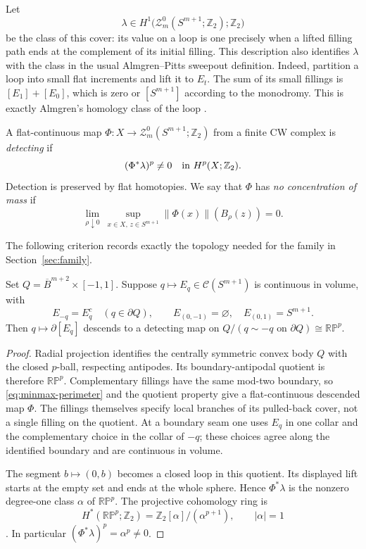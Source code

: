 Let
\[
 \lambda\in H^1\bigl(\mathcal Z_m^0(S^{m+1};\mathbb Z_2);
                     \mathbb Z_2\bigr)
\]
be the class of this cover: its value on a loop is one precisely when
a lifted filling path ends at the complement of its initial filling.
This description also identifies $\lambda$ with the class in the usual
Almgren--Pitts sweepout definition. Indeed, partition a loop into small
flat increments and lift it to $E_t$. The sum of its small fillings is
$[E_1]+[E_0]$, which is zero or $[S^{m+1}]$ according to the
monodromy. This is exactly Almgren's homology class of the loop
\cite[\S\S3.1--3.3 and the beginning of \S4]{MarquesNeves2017}.

\begin{definition}[Detection]\label{def:detecting}
A flat-continuous map
$\Phi:X\to\mathcal Z_m^0(S^{m+1};\mathbb Z_2)$ from a finite CW
complex is \emph{detecting} if
\[
 (\Phi^*\lambda)^p\ne0\quad\hbox{in }H^p(X;\mathbb Z_2).
\]
Detection is preserved by flat homotopies. We say that $\Phi$ has
\emph{no concentration of mass} if
\begin{equation}\label{eq:minmax-no-concentration}
 \lim_{\rho\downarrow0}\ 
 \sup_{x\in X,\,z\in S^{m+1}}
 \|\Phi(x)\|(B_\rho(z))=0.
\end{equation}
\end{definition}

The following criterion records exactly the topology needed for the
family in Section~\ref{sec:family}.

\begin{lemma}\label{lem:minmax-projective}
Set $Q=\overline B^{m+2}\times[-1,1]$. Suppose
$q\mapsto E_q\in\mathcal C(S^{m+1})$ is continuous in volume,
with
\[
 E_{-q}=E_q^c\quad(q\in\partial Q),\qquad
 E_{(0,-1)}=\varnothing,\quad E_{(0,1)}=S^{m+1}.
\]
Then $q\mapsto\partial[E_q]$ descends to a detecting map on
$Q/(q\sim-q\text{ on }\partial Q)\cong\mathbb{RP}^{p}$.
\end{lemma}

\begin{proof}
Radial projection identifies the centrally symmetric convex body $Q$
with the closed $p$-ball, respecting antipodes. Its boundary-antipodal
quotient is therefore $\mathbb{RP}^{p}$. Complementary fillings have
the same mod-two boundary, so \eqref{eq:minmax-perimeter} and the
quotient property give a flat-continuous descended map $\Phi$.
The fillings themselves specify local branches of its pulled-back
cover, not a single filling on the quotient. At a boundary seam one
uses $E_q$ in one collar and the complementary choice in the collar
of $-q$; these choices agree along the identified boundary and are
continuous in volume.

The segment $b\mapsto(0,b)$ becomes a closed loop in this quotient.
Its displayed lift starts at the empty set and ends at the whole
sphere. Hence $\Phi^*\lambda$ is the nonzero degree-one class
$\alpha$ of $\mathbb{RP}^{p}$. The projective cohomology ring is
\[
 H^*(\mathbb{RP}^{p};\mathbb Z_2)
   =\mathbb Z_2[\alpha]/(\alpha^{p+1}),\qquad |\alpha|=1
\]
\cite[Theorem~3.19, p.~220]{Hatcher2002}. In particular
$(\Phi^*\lambda)^p=\alpha^p\ne0$.
\end{proof}

